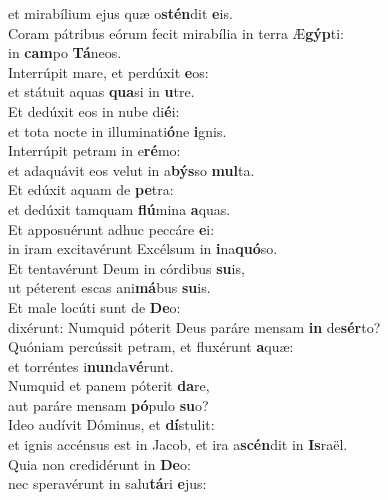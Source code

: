 \evenverse et mirabílium ejus quæ o\textbf{stén}dit \textbf{e}is.\\
\oddverse Coram pátribus eórum fecit mirabília in terra Æ\textbf{gýp}ti:~\*\\
\oddverse in \textbf{cam}po \textbf{Tá}neos.\\
\evenverse Interrúpit mare, et perdúxit \textbf{e}os:~\*\\
\evenverse et státuit aquas \textbf{qua}si in \textbf{u}tre.\\
\oddverse Et dedúxit eos in nube di\textbf{é}i:~\*\\
\oddverse et tota nocte in illuminati\textbf{ó}ne \textbf{i}gnis.\\
\evenverse Interrúpit petram in e\textbf{ré}mo:~\*\\
\evenverse et adaquávit eos velut in a\textbf{býs}so \textbf{mul}ta.\\
\oddverse Et edúxit aquam de \textbf{pe}tra:~\*\\
\oddverse et dedúxit tamquam \textbf{flú}mina \textbf{a}quas.\\
\evenverse Et apposuérunt adhuc peccáre \textbf{e}i:~\*\\
\evenverse in iram excitavérunt Excélsum in \textbf{i}na\textbf{quó}so.\\
\oddverse Et tentavérunt Deum in córdibus \textbf{su}is,~\*\\
\oddverse ut péterent escas ani\textbf{má}bus \textbf{su}is.\\
\evenverse Et male locúti sunt de \textbf{De}o:~\*\\
\evenverse dixérunt: Numquid póterit Deus paráre mensam \textbf{in} de\textbf{sér}to?\\
\oddverse Quóniam percússit petram, et fluxérunt \textbf{a}quæ:~\*\\
\oddverse et torréntes i\textbf{nun}da\textbf{vé}runt.\\
\evenverse Numquid et panem póterit \textbf{da}re,~\*\\
\evenverse aut paráre mensam \textbf{pó}pulo \textbf{su}o?\\
\oddverse Ideo audívit Dóminus, et \textbf{dí}stulit:~\*\\
\oddverse et ignis accénsus est in Jacob, et ira a\textbf{scén}dit in \textbf{Is}raël.\\
\evenverse Quia non credidérunt in \textbf{De}o:~\*\\
\evenverse nec speravérunt in salu\textbf{tá}ri \textbf{e}jus:\\
